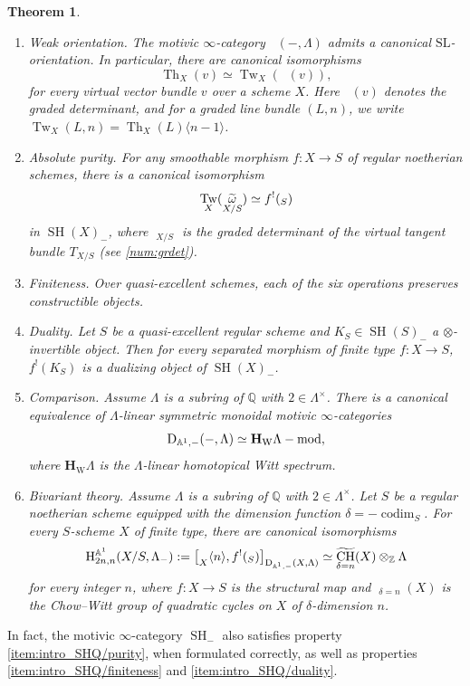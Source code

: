 \documentclass[11pt]{article}
\makeatletter
\numberwithin{equation}{section}\renewcommand{\encodingdefault}{TU}
\DeclareRobustCommand{\mathbbm}[1]{\csname jepbb@#1\endcsname}
\newcommand{\modl}[1]{#1\textnormal{-}\mathrm{mod}}
\renewcommand{\AA}{\mathbb A}
\newcommand{\un}{\mathbbm 1}
\newcommand{\HW}{\mathbf H_{\mathrm{W}}}
\newcommand{\BA}{\mathrm H^{\AA^1}}
\newcommand{\SL}{\mathrm{SL}}
\DeclareMathOperator{\codim}{codim}
\DeclareMathOperator{\SH}{SH}
\DeclareMathOperator{\DAminus}{D_{\AA^1,-}}
\DeclareMathOperator{\wCH}{\widetilde{CH}}
\newcommand{\twist}[1]{\langle #1 \rangle}
\DeclareMathOperator{\Th}{Th}
\DeclareMathOperator{\Tw}{Tw}
\DeclareMathOperator{\tdet}{\widetilde \det}
\DeclareMathOperator{\tomega}{\widetilde \omega}
\newcommand{\ZZ} {\mathbb Z}
\newcommand{\QQ} {\mathbb Q}
\newtheorem{thmi}{Theorem}
\theoremstyle{remark}
\theoremstyle{definition}
\numberwithin{equation}{thm}
\makeatother
\begin{document}
\begin{thmi}
\begin{enumerate}\renewcommand{\theenumi}{\Roman{enumi}}
\item\emph{Weak orientation.}
The motivic $\infty$-category $\DAminus(-, \Lambda)$ admits a canonical $\SL$\nobreakdash-orientation.
In particular, there are canonical isomorphisms\vspace*{-3pt}
\[
\Th_X(v) \simeq \Tw_X(\tdet(v)),
\]
for every virtual vector bundle $v$ over a scheme $X$.
Here $\tdet(v)$ denotes the graded determinant, and for a graded line bundle $(L,n)$, we write \hbox{$\Tw_X(L,n) = \Th_X(L)\twist{n-1}$}.
\item\emph{Absolute purity.}
For any smoothable morphism $f : X \to S$ of regular noetherian schemes, there is a canonical isomorphism\vspace*{-3pt}
\[
\Tw_X(\tomega_{X/S})
\simeq f^!(\un_{S})
\]
in $\SH(X)_-$, where $\tomega_{X/S}$ is the graded determinant of the virtual tangent bundle $T_{X/S}$ (see \ref{num:grdet}).
\item\emph{Finiteness.}
Over quasi-excellent schemes, each of the six operations preserves constructible objects.
\item\emph{Duality.}
Let $S$ be a quasi-excellent regular scheme and $K_S \in \SH(S)_-$ a $\otimes$-invertible object.
Then for every separated morphism of finite type $f : X \to S$, $f^!(K_S)$ is a dualizing object of $\SH(X)_-$.
\item\emph{Comparison.}\label{item:intro_SHminus/comparison}
Assume $\Lambda$ is a subring of $\QQ$ with $2 \in \Lambda^\times$.
There is a canonical equivalence of $\Lambda$-linear symmetric monoidal motivic $\infty$-categories
\[
\DAminus(-, \Lambda) \simeq \modl{\HW \Lambda},
\]
where $\HW \Lambda$ is the $\Lambda$-linear homotopical Witt spectrum.
\item\emph{Bivariant theory.}
Assume $\Lambda$ is a subring of $\QQ$ with $2 \in \Lambda^\times$.
Let $S$ be a regular noetherian scheme equipped with the dimension function $\delta=-\codim_S$.
For every $S$-scheme $X$ of finite type, there are canonical isomorphisms
\[
\BA_{2n,n}(X/S, \Lambda_-)
:= \big[ \un_X\twist{n}, f^!(\un_S) \big]_{\DAminus(X, \Lambda)}
\simeq \wCH_{\delta=n}(X) \otimes_\ZZ \Lambda
\]
for every integer $n$, where $f : X \to S$ is the structural map and $\wCH_{\delta=n}(X)$ is the Chow--Witt group of quadratic cycles on $X$ of $\delta$-dimension $n$.
\end{enumerate}
\end{thmi}

In fact, the motivic $\infty$-category $\SH_{-}$ also satisfies property \eqref{item:intro_SHQ/purity}, when formulated correctly, as well as properties \eqref{item:intro_SHQ/finiteness} and \eqref{item:intro_SHQ/duality}.
\end{document}
